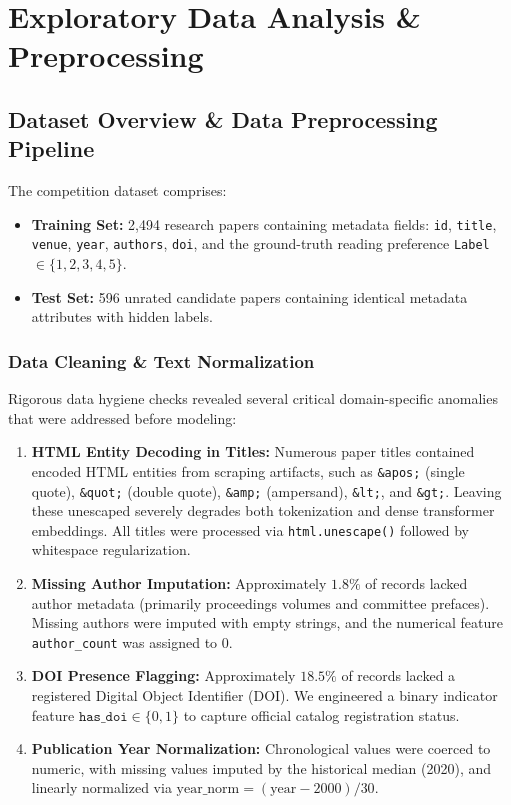 \chapter{Exploratory Data Analysis \& Preprocessing}
\label{chap:eda}

\section{Dataset Overview \& Data Preprocessing Pipeline}
The competition dataset comprises:
\begin{itemize}
  \item \textbf{Training Set:} 2,494 research papers containing metadata fields: \texttt{id}, \texttt{title}, \texttt{venue}, \texttt{year}, \texttt{authors}, \texttt{doi}, and the ground-truth reading preference \texttt{Label} $\in \{1, 2, 3, 4, 5\}$.
  \item \textbf{Test Set:} 596 unrated candidate papers containing identical metadata attributes with hidden labels.
\end{itemize}

\subsection{Data Cleaning \& Text Normalization}
Rigorous data hygiene checks revealed several critical domain-specific anomalies that were addressed before modeling:
\begin{enumerate}
  \item \textbf{HTML Entity Decoding in Titles:} Numerous paper titles contained encoded HTML entities from scraping artifacts, such as \texttt{\&apos;} (single quote), \texttt{\&quot;} (double quote), \texttt{\&amp;} (ampersand), \texttt{\&lt;}, and \texttt{\&gt;}. Leaving these unescaped severely degrades both tokenization and dense transformer embeddings. All titles were processed via \texttt{html.unescape()} followed by whitespace regularization.
  \item \textbf{Missing Author Imputation:} Approximately $1.8\%$ of records lacked author metadata (primarily proceedings volumes and committee prefaces). Missing authors were imputed with empty strings, and the numerical feature \texttt{author\_count} was assigned to 0.
  \item \textbf{DOI Presence Flagging:} Approximately $18.5\%$ of records lacked a registered Digital Object Identifier (DOI). We engineered a binary indicator feature $\texttt{has\_doi} \in \{0, 1\}$ to capture official catalog registration status.
  \item \textbf{Publication Year Normalization:} Chronological values were coerced to numeric, with missing values imputed by the historical median (2020), and linearly normalized via $\text{year\_norm} = (\text{year} - 2000) / 30$.
\end{enumerate}

